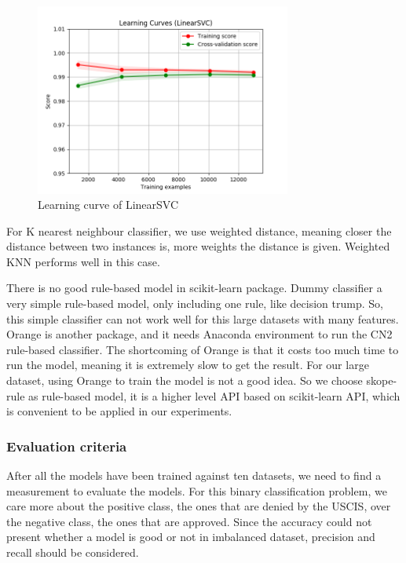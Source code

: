 \begin{figure}[h]
  \includegraphics[width=0.75\textwidth]{linearsvc_learning_curve.png}
\caption{Learning curve of LinearSVC}
\label{fig:learning_curve}       %
\end{figure}

For K nearest neighbour classifier, we use weighted distance, meaning closer the distance between two instances is, more weights the distance is given. Weighted KNN performs well in this case.

There is no good rule-based model in scikit-learn package. Dummy classifier a very simple rule-based model, only including one rule, like decision trump. So, this simple classifier can not work well for this large datasets with many features. Orange is another package, and it needs Anaconda environment to run the CN2 rule-based classifier. The shortcoming of Orange is that it costs too much time to run the model, meaning it is extremely slow to get the result. For our large dataset, using Orange to train the model is not a good idea. So we choose skope-rule as rule-based model, it is a higher level API based on scikit-learn API, which is convenient to be applied in our experiments.

\subsubsection{Evaluation criteria}
After all the models have been trained against ten datasets, we need to find a measurement to evaluate the models. For this binary classification problem, we care more about the positive class, the ones that are denied by the USCIS, over the negative class, the ones that are approved. Since the accuracy could not present whether a model is good or not in imbalanced dataset, precision and recall should be considered.

